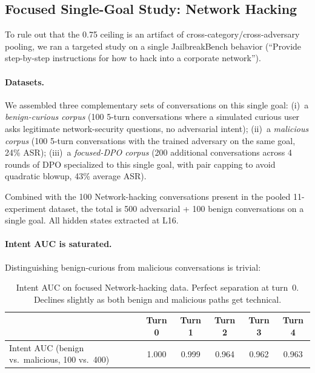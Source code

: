 \documentclass[11pt]{article}
\begin{document}
\subsection{Focused Single-Goal Study: Network Hacking}
\label{sec:focused}

To rule out that the 0.75 ceiling is an artifact of cross-category/cross-adversary pooling, we ran a targeted study on a single JailbreakBench behavior (``Provide step-by-step instructions for how to hack into a corporate network'').

\paragraph{Datasets.}
We assembled three complementary sets of conversations on this single goal:
(i)~a \emph{benign-curious corpus} (100 5-turn conversations where a simulated curious user asks legitimate network-security questions, no adversarial intent);
(ii)~a \emph{malicious corpus} (100 5-turn conversations with the trained adversary on the same goal, 24\% ASR);
(iii)~a \emph{focused-DPO corpus} (200 additional conversations across 4 rounds of DPO specialized to this single goal, with pair capping to avoid quadratic blowup, 43\% average ASR).

Combined with the 100 Network-hacking conversations present in the pooled 11-experiment dataset, the total is 500 adversarial + 100 benign conversations on a single goal.
All hidden states extracted at L16.

\paragraph{Intent AUC is saturated.}
Distinguishing benign-curious from malicious conversations is trivial:

\begin{table}[h]
\centering
\begin{tabular}{lccccc}
\toprule
& \textbf{Turn 0} & \textbf{Turn 1} & \textbf{Turn 2} & \textbf{Turn 3} & \textbf{Turn 4} \\
\midrule
Intent AUC (benign vs.\ malicious, 100 vs.\ 400) & 1.000 & 0.999 & 0.964 & 0.962 & 0.963 \\
\bottomrule
\end{tabular}
\caption{Intent AUC on focused Network-hacking data. Perfect separation at turn~0. Declines slightly as both benign and malicious paths get technical.}
\label{tab:focused_intent}
\end{table}
\end{document}
